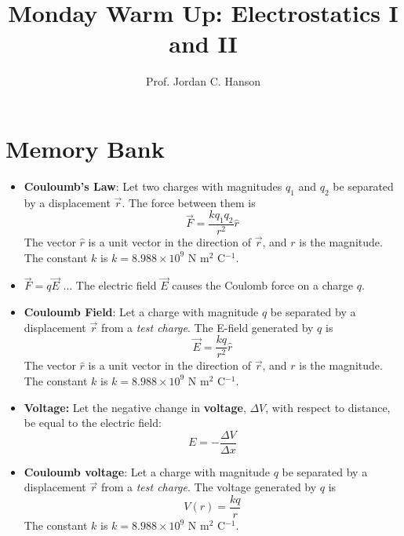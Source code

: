 \documentclass{article}
\begin{document}
\twocolumn

\title{Monday Warm Up: Electrostatics I and II}
\author{Prof. Jordan C. Hanson}

\maketitle

\section{Memory Bank}

\begin{itemize}
\item \textbf{Couloumb's Law}: Let two charges with magnitudes $q_1$ and $q_2$ be separated by a displacement $\vec{r}$.  The force between them is 
\begin{equation}
\vec{F} = \frac{k q_1 q_2}{r^2}\hat{r}
\end{equation}
The vector $\hat{r}$ is a unit vector in the direction of $\vec{r}$, and $r$ is the magnitude.  The constant $k$ is $k=8.988 \times 10^9$ N m$^2$ C$^{-1}$.
\item $\vec{F} = q\vec{E}$ ... The electric field $\vec{E}$ causes the Coulomb force on a charge $q$.
\item \textbf{Couloumb Field}: Let a charge with magnitude $q$ be separated by a displacement $\vec{r}$ from a \textit{test charge}.  The E-field generated by $q$ is 
\begin{equation}
\vec{E} = \frac{k q}{r^2}\hat{r}
\end{equation}
The vector $\hat{r}$ is a unit vector in the direction of $\vec{r}$, and $r$ is the magnitude.  The constant $k$ is $k=8.988 \times 10^9$ N m$^2$ C$^{-1}$.
\item \textbf{Voltage:} Let the negative change in \textbf{voltage}, $\Delta V$, with respect to distance, be equal to the electric field:
\begin{equation}
E = - \frac{\Delta V}{\Delta x}
\end{equation}
\item \textbf{Couloumb voltage}: Let a charge with magnitude $q$ be separated by a displacement $\vec{r}$ from a \textit{test charge}.  The voltage generated by $q$ is 
\begin{equation}
V(r) = \frac{k q}{r}
\end{equation}
The constant $k$ is $k=8.988 \times 10^9$ N m$^2$ C$^{-1}$.
\end{itemize}
\end{document}
